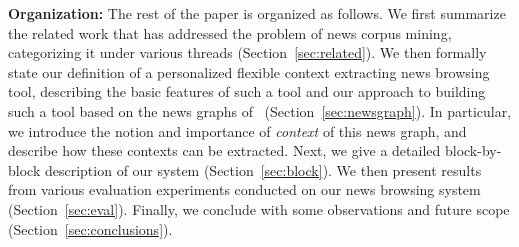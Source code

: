 \textbf{Organization:} The rest of the paper is organized as
follows. We first summarize the related work that has addressed the
problem of news corpus mining, categorizing it under various threads
(Section~\ref{sec:related}). We then formally state our definition of
a personalized flexible context extracting news browsing tool,
describing the basic features of such a tool and our approach to
building such a tool based on the news graphs
of~\cite{choudhary@ecir2008} (Section~\ref{sec:newsgraph}).  In
particular, we introduce the notion and importance of \emph{context}
of this news graph, and describe how these contexts can be extracted.
Next, we give a detailed block-by-block description of our system
(Section~\ref{sec:block}). We then present results from various
evaluation experiments conducted on our news browsing system
(Section~\ref{sec:eval}). Finally, we conclude with some
observations and future scope (Section~\ref{sec:conclusions}).
